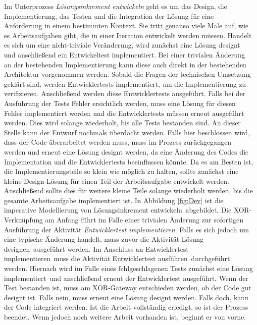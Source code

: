 Im Unterprozess \textit{Lösungsinkrement entwickeln} geht es um das Design, die Implementierung, das Testen und die Integration der Lösung für eine Anforderung in einem bestimmten Kontext. Sie tritt genauso viele Male auf, wie es Arbeitsaufgaben gibt, die in einer Iteration entwickelt werden müssen.
 Handelt es sich um eine nicht-triviale Veränderung, wird zunächst eine Lösung designt und anschließend ein Entwickeltest implementiert. Bei einer trivialen Änderung an der bestehenden Implementierung kann diese auch direkt in der bestehenden Architektur vorgenommen werden. \newline
 Sobald die Fragen der technischen Umsetzung geklärt sind, werden Entwicklertests implementiert, um die Implementierung zu verifizieren. Anschließend werden diese Entwicklertests ausgeführt.\newline
 Falls bei der Ausführung der Tests Fehler ersichtlich werden, muss eine Lösung für diesen Fehler implementiert werden und die Entwicklertests müssen erneut ausgeführt werden. Dies wird solange wiederholt, bis alle Tests bestanden sind.\newline
An dieser Stelle kann der Entwurf nochmals überdacht werden. Falls hier beschlossen wird, dass der Code überarbeitet werden muss, muss im Prozess zurückgegangen werden und erneut eine Lösung designt werden, da eine Änderung des Codes die Implementation und die Entwicklertests beeinflussen könnte.\newline
 Da es am Besten ist, die Implementierungsteile so klein wie möglich zu halten, sollte zunächst eine kleine Design-Lösung für einen Teil der Arbeitsaufgabe entwickelt werden. Anschließend sollte dies für weitere kleine Teile solange wiederholt werden, bis die gesamte Arbeitsaufgabe implementiert ist. \newline
 In Abbildung \ref{fig:Dev} ist die imperative Modellierung von \grqq Lösungsinkrement entwickeln\grqq \ abgebildet.\newline
 Die XOR-Verknüpfung am Anfang führt im Falle einer trivialen Änderung zur sofortigen Ausführung der Aktivität \textit{Entwicklertest implementieren}. Falls es sich jedoch um eine typische Änderung handelt, muss zuvor die Aktivität \grqq Lösung designen\grqq \ ausgeführt werden. Im Anschluss an \grqq Entwicklertest implementieren\grqq \ muss die Aktivität \grqq Entwicklertest ausführen\grqq \ durchgeführt werden.\newline
 Hiernach wird im Falle eines fehlgeschlagenen Tests zunächst eine \grqq Lösung implementiert\grqq \ und anschließend erneut der \grqq Entwicklertest ausgeführt\grqq. \newline
 Wenn der Test bestanden ist, muss am XOR-Gateway entschieden werden, ob der Code gut designt ist. Falls nein, muss erneut eine Lösung designt werden. Falls doch, kann der Code integriert werden. Ist die Arbeit vollständig erledigt, so ist der Prozess beendet. Wenn jedoch noch weitere Arbeit vorhanden ist, beginnt er von vorne.
 
